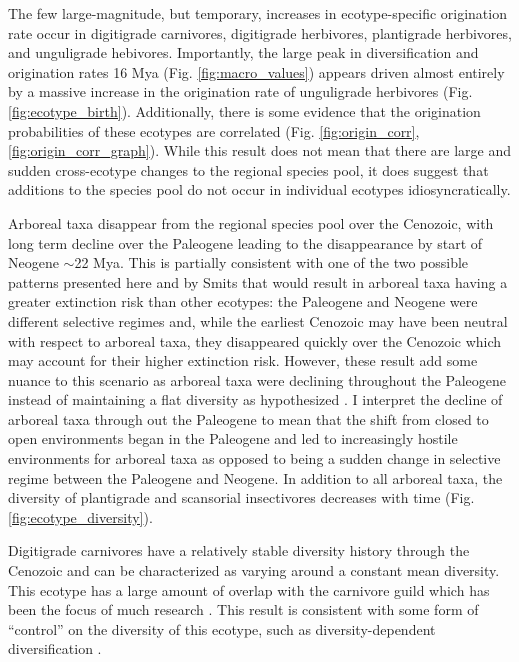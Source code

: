 The few large-magnitude, but temporary, increases in ecotype-specific origination rate occur in digitigrade carnivores, digitigrade herbivores, plantigrade herbivores, and unguligrade hebivores. Importantly, the large peak in diversification and origination rates 16 Mya (Fig. \ref{fig:macro_values}) appears driven almost entirely by a massive increase in the origination rate of unguligrade herbivores (Fig. \ref{fig:ecotype_birth}). Additionally, there is some evidence that the origination probabilities of these ecotypes are correlated (Fig. \ref{fig:origin_corr}, \ref{fig:origin_corr_graph}). While this result does not mean that there are large and sudden cross-ecotype changes to the regional species pool, it does suggest that additions to the species pool do not occur in individual ecotypes idiosyncratically.

Arboreal taxa disappear from the regional species pool over the Cenozoic, with long term decline over the Paleogene leading to the disappearance by start of Neogene \(\sim\)22 Mya. This is partially consistent with one of the two possible patterns presented here and by Smits \citep{Smits2015b} that would result in arboreal taxa having a greater extinction risk than other ecotypes: the Paleogene and Neogene were different selective regimes and, while the earliest Cenozoic may have been neutral with respect to arboreal taxa, they disappeared quickly over the Cenozoic which may account for their higher extinction risk. However, these result add some nuance to this scenario as arboreal taxa were declining throughout the Paleogene instead of maintaining a flat diversity as hypothesized \citep{Smits2015b}. I interpret the decline of arboreal taxa through out the Paleogene to mean that the shift from closed to open environments began in the Paleogene and led to increasingly hostile environments for arboreal taxa as opposed to being a sudden change in selective regime between the Paleogene and Neogene. In addition to all arboreal taxa, the diversity of plantigrade and scansorial insectivores decreases with time (Fig. \ref{fig:ecotype_diversity}).

Digitigrade carnivores have a relatively stable diversity history through the Cenozoic and can be characterized as varying around a constant mean diversity. This ecotype has a large amount of overlap with the carnivore guild which has been the focus of much research \citep{Slater2015c,Valkenburgh1999,Pires2015a,Janis1993c}. This result is consistent with some form of ``control'' on the diversity of this ecotype, such as diversity-dependent diversification \citep{Slater2015c,Silvestro2015b,Valkenburgh1999}.

